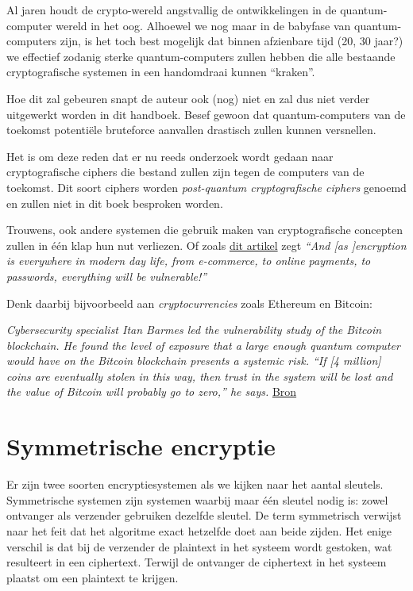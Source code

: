 \documentclass[
  10pt,
  dutch,
  paper=a4,
  ,captions=tableheading
]{scrbook}
\begin{document}
Al jaren houdt de crypto-wereld angstvallig de ontwikkelingen in de
quantum-computer wereld in het oog. Alhoewel we nog maar in de babyfase
van quantum-computers zijn, is het toch best mogelijk dat binnen
afzienbare tijd (20, 30 jaar?) we effectief zodanig sterke
quantum-computers zullen hebben die alle bestaande cryptografische
systemen in een handomdraai kunnen ``kraken''.

Hoe dit zal gebeuren snapt de auteur ook (nog) niet en zal dus niet
verder uitgewerkt worden in dit handboek. Besef gewoon dat
quantum-computers van de toekomst potentiële bruteforce aanvallen
drastisch zullen kunnen versnellen.

Het is om deze reden dat er nu reeds onderzoek wordt gedaan naar
cryptografische ciphers die bestand zullen zijn tegen de computers van
de toekomst. Dit soort ciphers worden \emph{post-quantum cryptografische
ciphers} genoemd en zullen niet in dit boek besproken worden.

\begin{noteblock}
Trouwens, ook andere systemen die gebruik maken van cryptografische
concepten zullen in één klap hun nut verliezen. Of zoals
\href{https://www.uclftr.com/post/what-does-the-rise-of-quantum-computers-mean-for-encryption-technology}{dit
artikel} zegt \emph{``And {[}as {]}encryption is everywhere in modern
day life, from e-commerce, to online payments, to passwords, everything
will be vulnerable!''}

Denk daarbij bijvoorbeeld aan \emph{cryptocurrencies} zoals Ethereum en
Bitcoin:

\emph{Cybersecurity specialist Itan Barmes led the vulnerability study
of the Bitcoin blockchain. He found the level of exposure that a large
enough quantum computer would have on the Bitcoin blockchain presents a
systemic risk. ``If {[}4 million{]} coins are eventually stolen in this
way, then trust in the system will be lost and the value of Bitcoin will
probably go to zero,'' he says.}
\href{https://www.investmentmonitor.ai/tech/quantum-computing-bitcoins-crypto-encryption}{Bron}
\end{noteblock}

\section{Symmetrische encryptie}\label{symmetrische-encryptie}

Er zijn twee soorten encryptiesystemen als we kijken naar het aantal
sleutels. Symmetrische systemen zijn systemen waarbij maar één sleutel
nodig is: zowel ontvanger als verzender gebruiken dezelfde sleutel. De
term symmetrisch verwijst naar het feit dat het algoritme exact
hetzelfde doet aan beide zijden. Het enige verschil is dat bij de
verzender de plaintext in het systeem wordt gestoken, wat resulteert in
een ciphertext. Terwijl de ontvanger de ciphertext in het systeem
plaatst om een plaintext te krijgen.
\end{document}
